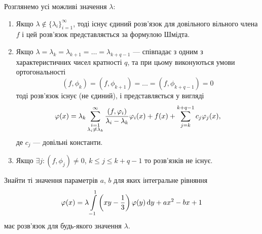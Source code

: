 Розглянемо усі можливі значення $\lambda$:
\begin{enumerate}
	\item Якщо $\lambda \notin \{\lambda_i\}_{i=1}^\infty$, тоді існує єдиний розв'язок для довільного вільного члена $f$ і цей розв'язок представляється за формулою Шмідта.
	
	\item Якщо $\lambda = \lambda_k = \lambda_{k + 1} = \ldots = \lambda_{k + q - 1}$ --- співпадає з одним з характеристичних чисел кратності $q$, та при цьому виконуються умови ортогональності
	\begin{equation}
		(f, \phi_k) = (f, \phi_{k + 1}) = \ldots = (f, \phi_{k + q - 1}) = 0
	\end{equation}
	тоді розв'язок існує (не єдиний), і представляється у вигляді 
	\begin{equation}
		\varphi(x) = \lambda_k \displaystyle\sum\limits_{\substack{i = 1 \\ \lambda_i \ne \lambda_k}}^\infty \dfrac{(f, \varphi_i)}{\lambda_i - \lambda_k} \varphi_i(x) + f(x) + \displaystyle\sum\limits_{j = k}^{k + q - 1} c_j \varphi_j(x),
	\end{equation}
	де $c_j$ --- довільні константи.

	\item Якщо $\exists j: (f, \phi_j) \ne 0$, $k \le j \le k + q - 1$ то розв'язків не існує.
\end{enumerate}

\newpage

\begin{example}
	Знайти ті значення параметрів $a$, $b$ для яких інтегральне рівняння
	\begin{equation*}
		\varphi(x) = \lambda \displaystyle\int\limits_{-1}^1 \left( xy - \dfrac{1}{3} \right) \varphi(y) \mathop{}\!\mathrm{d} y + ax^2 - bx + 1 
	\end{equation*}
	має розв'язок для будь-якого значення $\lambda$.
\end{example}

